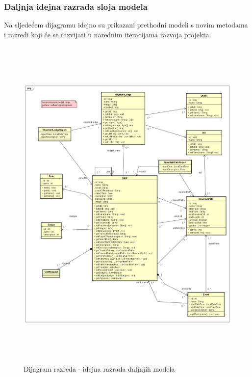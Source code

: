 			\subsubsection{Daljnja idejna razrada sloja modela}
			Na sljedećem dijagramu idejno su prikazani prethodni modeli s novim metodama i razredi koji će se razvijati u narednim iteracijama razvoja projekta. 
			\begin{figure}[H]
				\includegraphics[scale=0.6, height=170mm, width=165mm]{dijagrami/future-model.png} %
				\centering
				\caption{Dijagram razreda - idejna razrada daljnjih modela}
				\label{fig:dijagrami_razreda3}
			\end{figure}
			\newpage
